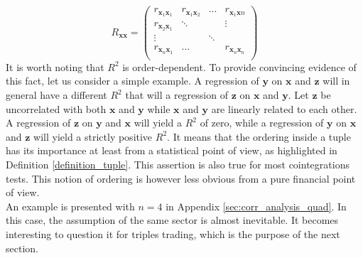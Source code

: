 \documentclass[11pt,a4,twosided,singlespacing,titlepagenumber=on]{scrreprt}
\numberwithin{equation}{chapter} %
\theoremstyle{remark}
\newcommand{\matr}[1]{\mathbf{#1}}
\begin{document}
\begin{equation}
R_{\matr{x}\matr{x}} =\begin{pmatrix}
r_{\matr{x}_1\matr{x}_1}    & r_{\matr{x}_1\matr{x}_2} & ...  & r_{\matr{x}_1\matr{x}n}  \\
r_{\matr{x}_2\matr{x}_1}    & \ddots &   & \vdots  \\
\vdots       &   & \ddots &   \\
r_{\matr{x}_n\matr{x}_1}    & \hdots &   & r_{\matr{x}_n\matr{x}_n} \label{rxx} \\
\end{pmatrix} 
\end{equation}
It is worth noting that $R^2$ is order-dependent. To provide convincing evidence of this fact, let us consider a simple example. A regression of $\matr{y}$ on $\matr{x}$ and $\matr{z}$ will in general have a different $R^2$ that will a regression of $\matr{z}$ on $\matr{x}$ and $\matr{y}$. Let $\matr{z}$ be uncorrelated with both $\matr{x}$ and $\matr{y}$ while $\matr{x}$ and $\matr{y}$ are linearly related to each other. A regression of $\matr{z}$ on $\matr{y}$ and $\matr{x}$ will yield a $R^2$ of zero, while a regression of $\matr{y}$ on $\matr{x}$ and $\matr{z}$ will yield a strictly positive $R^2$. It means that the ordering inside a tuple has its importance at least from a statistical point of view, as highlighted in Definition \ref{definition_tuple}. This assertion is also true for most cointegrations tests. This notion of ordering is however less obvious from a pure financial point of view. \\

An example is presented with $n=4$ in Appendix \ref{sec:corr_analysis_quad}. In this case, the assumption of the same sector is almost inevitable. It becomes interesting to question it for triples trading, which is the purpose of the next section.
\end{document}
